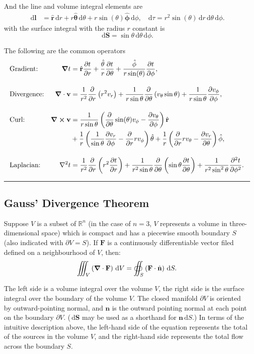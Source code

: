 \documentclass[a4paper]{article}
\newcommand{\dmr}[1]{\, \mathrm{d}#1} %
\numberwithin{equation}{subsection}
\let\oldhat\hat
\renewcommand{\vec}[1]{\mathbf{#1}}
\renewcommand{\hat}[1]{\oldhat{\mathbf{#1}}}
\begin{document}
And the line and volume integral elements are
\begin{align*}
    \dmr{\vec{l}} &= \hat{r}\dmr{r} + r\hat{\theta}\dmr{\theta} + r  \sin(\theta) \hat{\phi} \dmr{\phi}, & \dmr{\tau} = r^2 \sin(\theta) \dmr{r} \dmr{\theta} \dmr{\phi}.
\end{align*}
with the surface integral with the radius $r$ constant is
\[
    \dmr{\vec{S}} = \sin\theta \dmr{\theta} \dmr{\phi}.
\]

The following are the common operators
\begin{align*}
    &\text{Gradient:} &\grad t  &= \hat{r}\pdv{t}{r} + \frac{\hat{\theta}}{r}\pdv{t}{\theta} + \frac{\hat{\phi}}{r \sin(\theta)}\pdv{t}{\phi},\\[1em]
    &\text{Divergence:} &\grad\cdot\vec{v} &= \frac{1}{r^{2}} \frac{\partial}{\partial r}\left(r^{2} v_r \right)+\frac{1}{r \sin \theta} \frac{\partial}{\partial \theta}\left(v_{\theta} \sin \theta\right)+\frac{1}{r \sin \theta} \frac{\partial v_{\phi}}{\partial \phi},\\[1em]
    &\text{Curl:} &\grad \cross \vec{v} &= \frac{1}{r\sin\theta}\left(\pdv{}{\theta}\sin(\theta) v_\phi- \pdv{v_\theta}{\phi}\right)\hat{r}\\
    &&&+\frac{1}{r}\left(\frac{1}{\sin\theta}\pdv{v_r}{\phi}-\pdv{}{r}  r v_\phi  \right)\hat{\theta}+ \frac{1}{r}\left(\pdv{}{r}rv_\theta-\pdv{v_r}{\theta}\right)\hat{\phi},\\[1em]
    &\text{Laplacian:} &\laplacian t &= \frac{1}{r^2}\pdv{}{r}\left(r^2\pdv{t}{r}\right)+ \frac{1}{r^2\sin\theta}\pdv{}{\theta}\left(\sin\theta\pdv{t}{\theta}\right) +\frac{1}{r^2 \sin^2 \theta}\pdv[2]{t}{\phi}.
\end{align*}

\par\noindent\rule{\textwidth}{0.4pt}

\subsection{Gauss' Divergence Theorem}
Suppose $V$ is a subset of $\mathbb{R}^n$ (in the case of $n=3$, $V$ represents a volume in three-dimensional space) which is compact and has a piecewise smooth boundary $S$ (also indicated with $\partial V = S$). If $\vec{F}$ is a continuously differentiable vector filed defined on a neighbourhood of $V$, then:
\[
    \iiint_{V} \left(\grad \cdot \vec{F}\right)\dmr{V} = \oiint_{S} \left(\vec{F}\cdot\hat{n}\right)\dmr{S}.
\]
\par The left side is a volume integral over the volume $V$, the right side is the surface integral over the boundary of the volume $V$. The closed manifold $\partial V$ is oriented by outward-pointing normal, and $\vec{n}$ is the outward pointing normal at each point on the boundary $\partial V$. ($\dmr{\vec{S}}$ may be used as a shorthand for $\vec{n}\dmr{S}$.) In terms of the intuitive description above, the left-hand side of the equation represents the total of the sources in the volume $V$, and the right-hand side represents the total flow across the boundary $S$.\cite{noauthor_divergence_2021}
\end{document}
